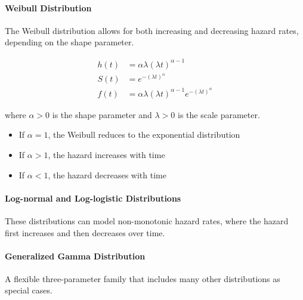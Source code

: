 \paragraph{Weibull Distribution}
The Weibull distribution allows for both increasing and decreasing hazard rates, depending on the shape parameter.

\begin{equationbox}[title=Weibull Distribution]
\begin{align}
h(t) &= \alpha \lambda (\lambda t)^{\alpha-1}\\
S(t) &= e^{-(\lambda t)^\alpha}\\
f(t) &= \alpha \lambda (\lambda t)^{\alpha-1} e^{-(\lambda t)^\alpha}
\end{align}

where $\alpha > 0$ is the shape parameter and $\lambda > 0$ is the scale parameter.
\begin{itemize}
    \item If $\alpha = 1$, the Weibull reduces to the exponential distribution
    \item If $\alpha > 1$, the hazard increases with time
    \item If $\alpha < 1$, the hazard decreases with time
\end{itemize}
\end{equationbox}

\paragraph{Log-normal and Log-logistic Distributions}
These distributions can model non-monotonic hazard rates, where the hazard first increases and then decreases over time.

\paragraph{Generalized Gamma Distribution}
A flexible three-parameter family that includes many other distributions as special cases.

